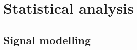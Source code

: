 \chapter{Statistical analysis}
\label{chap:stat}


\section{Signal modelling}
\label{stat:sec:signal_model}
